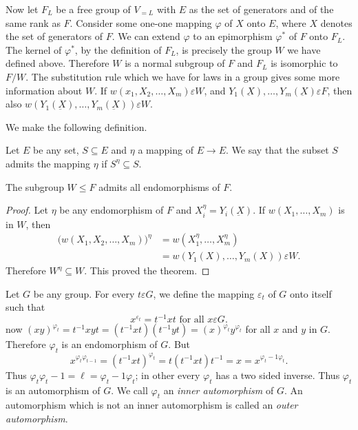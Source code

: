 Now let $F_L$ be a free group of $V_{=L}$ with $E$ as the set of
generators and of the same rank as $F$. Consider some one-one mapping
$\varphi$ of $X$ onto $E$, where $X$ denotes the set of generators of
$F$. We can extend $\varphi$ to an epimorphism $\varphi^*$ of $F$ onto
$F_L$. The kernel of $\varphi^*$, by the definition of $F_L$, is
precisely the group $W$ we have defined above. Therefore $W$ is a
normal subgroup of $F$ and $F_L$ is isomorphic to $F/W$. The
substitution rule which we have for laws in a group gives some more
information about $W$. If $w(x_1, X_2, \ldots, X_m)\varepsilon W$, and
$Y_1(\underbar{X}),\ldots,Y_m(\underbar{X}) \varepsilon F$, then also
$w(Y_1(\underbar{X}),\ldots,Y_m(\underbar{X})) \varepsilon W$.  
 
We make the following definition.

\begin{definition}
  Let $E$ be any set, $S \subseteq E$ and $\eta$ a mapping of $E \to
  E$. We say that the subset $S$ admits the mapping $\eta$ if $S^\eta
  \subseteq S$. 
\end{definition}
 
\setcounter{Theorem}{0}
\begin{Theorem}%
  The subgroup $W \leq F$ admits all endomorphisms of $F$.
\end{Theorem} 
 
\begin{proof}
  Let $\eta$ be any endomorphism of $F$ and $X^\eta_i =
  Y_i(\underbar{X})$. If $w(X_1,\ldots, X_m)$ is in $W$, then 
  \begin{align*}
    \bigg ( w(X_1,X_2,\ldots, X_m) \bigg) ^\eta & = w (X^\eta_1,\ldots
   , X^\eta_m)\\
    & = w(Y_1(X),\ldots, Y_m(X)) \varepsilon W.
  \end{align*}
  Therefore $W^\eta \subseteq W$. This proved the theorem.
 \end{proof} 
 
Let $G$ be any group. For every $t \varepsilon G$, we define the
mapping $\varepsilon_t$ of $G$ onto itself such that 
$$
x^{\varepsilon_t} = t^{-1} xt \text{ for all } x \varepsilon G.
$$
now $(xy)^{\varphi_t}=t^{-1} x y t = (t^{-1}x t) (t^{-1} y
t)=(x)^{\varphi_t} y^{\varphi_t}$ for all $x$ and $y$ in
$G$. Therefore $\varphi_t$ is an endomorphism of $G$. But 
$$
x^{\varphi_t \varphi_{t-1}} = (t^{-1}x t)^{\varphi_t} = t(t^{-1} x
t)t^{-1} = x = x^{\varphi_t -1 \varphi_t}. 
$$
Thus $\varphi_t \varphi_t -1 = \ell = \varphi_t -1 \varphi_t$; in
other every $\varphi_t$ has a two sided inverse. Thus $\varphi_t$ is
an automorphism of $G$. We call $\varphi_t$ an \textit{inner
  automorphism} of $G$. An automorphism which is not an inner
automorphism is called an \textit {outer automorphism}. 
  
